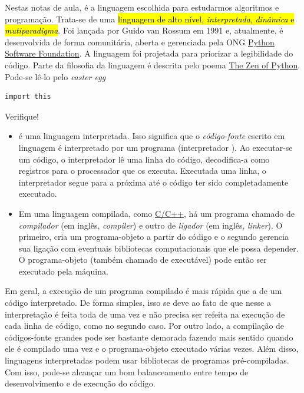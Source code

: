 Nestas notas de aula, \hl{{\python}} é a linguagem escolhida para estudarmos algoritmos e programação. Trata-se de uma \hl{linguagem de alto nível, \emph{interpretada}, \emph{dinâmica} e \emph{mutiparadigma}}. Foi lançada por Guido van Rossum{\rossum} em 1991 e, atualmente, é desenvolvida de forma comunitária, aberta e gerenciada pela ONG \href{https://pt.wikipedia.org/wiki/Python_Software_Foundation}{Python Software Foundation}. A linguagem foi projetada para priorizar a legibilidade do código. Parte da filosofia da linguagem é descrita pelo poema \href{https://pt.wikipedia.org/wiki/Zen_de_Python}{The Zen of Python}. Pode-se lê-lo pelo \textit{easter egg} {\python}

\begin{lstlisting}
import this
\end{lstlisting}

Verifique!

\begin{itemize}
\item {}

  {\python} é uma linguagem interpretada. Isso significa que o \emph{código-fonte} escrito em linguagem {\python} é interpretado por um programa (interpretador {\python}). Ao executar-se um código, o interpretador lê uma linha do código, decodifica-a como registros para o processador que os executa. Executada uma linha, o interpretador segue para a próxima até o código ter sido completadamente executado.

\item {}

  Em uma linguagem compilada, como \href{https://pt.wikipedia.org/wiki/C\%2B\%2B}{C/C++}, há um programa chamado de \emph{compilador} (em inglês, \textit{compiler}) e outro de \emph{ligador} (em inglês, \textit{linker}). O primeiro, cria um programa-objeto a partir do código e o segundo gerencia sua ligação com eventuais bibliotecas computacionais que ele possa depender. O programa-objeto (também chamado de executável) pode então ser executado pela máquina.
\end{itemize}

Em geral, a execução de um programa compilado é mais rápida que a de um código interpretado. De forma simples, isso se deve ao fato de que nesse a interpretação é feita toda de uma vez e não precisa ser refeita na execução de cada linha de código, como no segundo caso. Por outro lado, a compilação de códigos-fonte grandes pode ser bastante demorada fazendo mais sentido quando ele é compilado uma vez e o programa-objeto executado várias vezes. Além disso, linguagens interpretadas podem usar bibliotecas de programas pré-compiladas. Com isso, pode-se alcançar um bom balanceamento entre tempo de desenvolvimento e de execução do código.

